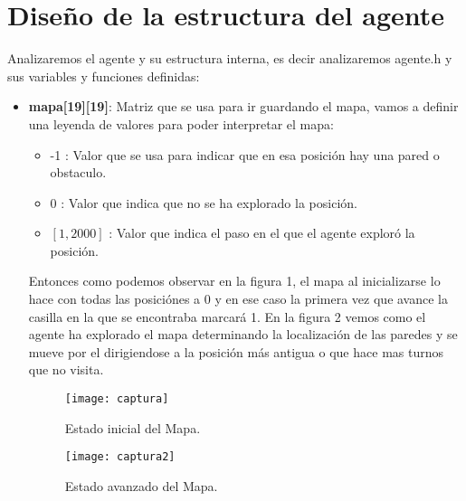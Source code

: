 \documentclass[a4paper, 11pt]{article} %
\begin{document}
\section{Diseño de la estructura del agente}
Analizaremos el agente y su estructura interna, es decir analizaremos agente.h y sus variables y funciones definidas:
\begin{itemize}
\item \textbf{mapa[19][19]}: Matriz que se usa para ir guardando el mapa, vamos a definir una leyenda de valores para poder interpretar el mapa:
\begin{itemize}
\item -1 : Valor que se usa para indicar que en esa posición hay una pared o obstaculo.
\item 0 : Valor que indica que no se ha explorado la posición. 
\item $[1,2000]$ : Valor que indica el paso en el que el agente exploró la posición.
\end{itemize}
Entonces como podemos observar en la figura 1, el mapa al inicializarse lo hace con todas las posiciónes a 0 y en ese caso la primera vez que avance la casilla en la que se encontraba marcará 1. En la figura 2 vemos como el agente ha explorado el mapa determinando la localización de las paredes y se mueve por el dirigiendose a la posición más antigua o que hace mas turnos que no visita.
\begin{figure}[H]
\centering 
\texttt{[image: captura]} 
\caption{Estado inicial del Mapa.}
\label{contexto:figura} 
\end{figure}
\begin{figure}[H]
\centering 
\texttt{[image: captura2]} 
\caption{Estado avanzado del Mapa.}
\label{contexto:figura} 
\end{figure}


\end{itemize}
\end{document}
